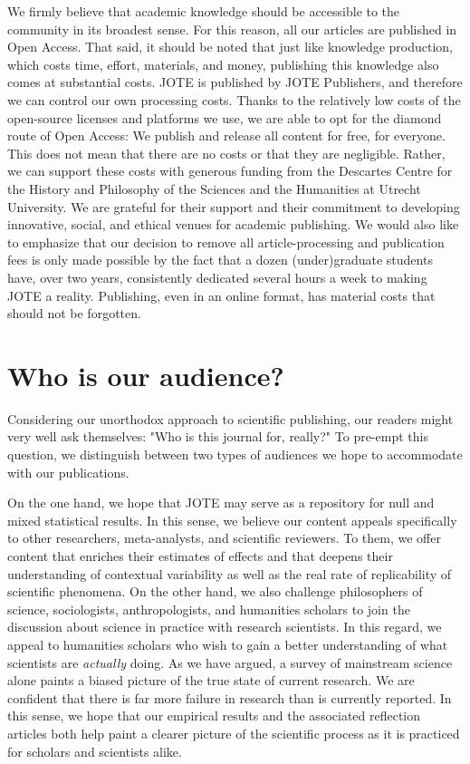 \documentclass[twocolumn, serif, editorial, authordate]{jote-article}
\begin{document}
We firmly believe that academic knowledge should be accessible to the community in its broadest sense. For this reason, all our articles are published in Open Access. That said, it should be noted that just like knowledge production, which costs time, effort, materials, and money, publishing this knowledge also comes at substantial costs. JOTE is published by JOTE Publishers, and therefore we can control our own processing costs. Thanks to the relatively low costs of the open-source licenses and platforms we use, we are able to opt for the diamond route of Open Access: We publish and release all content for free, for everyone. This does not mean that there are no costs or that they are negligible. Rather, we can support these costs with generous funding from the Descartes Centre for the History and Philosophy of the Sciences and the Humanities at Utrecht University. We are grateful for their support and their commitment to developing innovative, social, and ethical venues for academic publishing. We would also like to emphasize that our decision to remove all article-processing and publication fees is only made possible by the fact that a dozen (under)graduate students have, over two years, consistently dedicated several hours a week to making JOTE a reality. Publishing, even in an online format, has material costs that should not be forgotten.

 {} \section*{Who is our audience?}

Considering our unorthodox approach to scientific publishing, our readers might very well ask themselves: "Who is this journal for, really?"  To pre-empt this question, we distinguish between two types of audiences we hope to accommodate with our publications.

On the one hand, we hope that JOTE may serve as a repository for null and mixed statistical results. In this sense, we believe our content appeals specifically to other researchers, meta-analysts, and scientific reviewers. To them, we offer content that enriches their estimates of effects and that deepens their understanding of contextual variability as well as the real rate of replicability of scientific phenomena. On the other hand, we also challenge philosophers of science, sociologists, anthropologists, and humanities scholars to join the discussion about science in practice with research scientists. In this regard, we appeal to humanities scholars who wish to gain a better understanding of what scientists are \emph{actually} doing. As we have argued, a survey of mainstream science alone paints a biased picture of the true state of current research. We are confident that there is far more failure in research than is currently reported. In this sense, we hope that our empirical results and the associated reflection articles both help paint a clearer picture of the scientific process as it is practiced for scholars and scientists alike.
\end{document}
